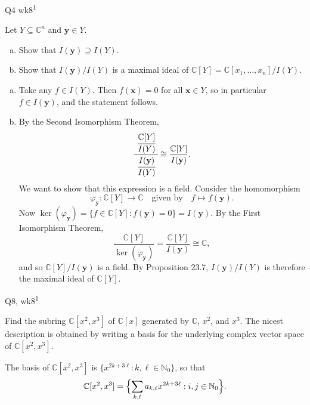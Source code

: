 \begin{problem}{Q4 wk8\textsuperscript{1}}{}


    Let $Y \subseteq \mathbb{C}^n$ and $\mathbf{y} \in Y$.
        \begin{enumerate}[a)]
            \item Show that $I(\mathbf{y}) \supseteq I(Y)$.
            \item Show that $I(\mathbf{y})/I(Y)$ is a maximal ideal of $\mathbb{C}[Y] = \mathbb{C}[x_1, \ldots, x_n]/I(Y)$.
        \end{enumerate}

    \tcblower

    \begin{enumerate}[a)]
        \item Take any $f \in I(Y)$. Then $f(\mathbf{x}) = 0$ for all $\mathbf{x} \in Y$, so in particular $f \in I(\mathbf{y})$, and the statement follows.
        \item By the Second Isomorphism Theorem,
            $$ \cfrac{\ \cfrac{\mathbb{C}[Y]}{I(Y)} \ }{\cfrac{I(\mathbf{y})}{I(Y)}} \cong \frac{\mathbb{C}[Y]}{I(\mathbf{y})} . $$
        We want to show that this expression is a field. Consider the homomorphism
            $$ \varphi_\mathbf{y} : \mathbb{C}[Y] \to \mathbb{C} \quad \text{given by} \quad f \mapsto f(\mathbf{y}) . $$
        Now $\ker(\varphi_\mathbf{y}) = \{ f \in \mathbb{C}[Y] : f(\mathbf{y}) = 0 \} = I(\mathbf{y})$. By the First Isomorphism Theorem,
            $$ \frac{\mathbb{C}[Y]}{\ker(\varphi_\mathbf{y})} = \frac{\mathbb{C}[Y]}{I(\mathbf{y})} \cong \mathbb{C} , $$
        and so $\mathbb{C}[Y] / I(\mathbf{y})$ is a field. By Proposition 23.7, $I(\mathbf{y})/I(Y)$ is therefore the maximal ideal of $\mathbb{C}[Y]$.
    \end{enumerate}

\end{problem}

\begin{problem}{Q8, wk8\textsuperscript{1}}{}


    Find the subring $\mathbb{C}[x^2, x^3]$ of $\mathbb{C}[x]$ generated by $\mathbb{C}$, $x^2$, and $x^3$. The nicest description is obtained by writing a basis for the underlying complex vector space of $\mathbb{C}[x^2, x^3]$.

    \tcblower

    The basis of $\mathbb{C}[x^2, x^3]$ is $\{ x^{2k + 3\ell} : k, \ell \in \mathbb{N}_0 \}$, so that
        $$ \mathbb{C}[x^2, x^3] = \Bigl\{ \sum_{k, \ell} a_{k, \ell} x^{2k + 3\ell} : i, j \in \mathbb{N}_0 \Bigr\} . $$

\end{problem}


